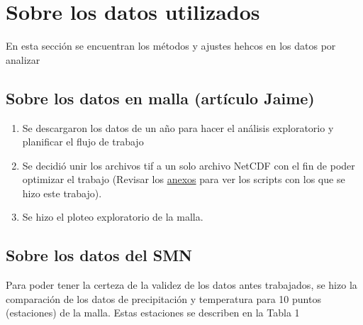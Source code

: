 \documentclass[
  11pt,
  letterpaper,
  DIV=11,
  numbers=noendperiod]{scrartcl}
\providecommand{\tightlist}{%
  \setlength{\itemsep}{0pt}\setlength{\parskip}{0pt}}
\begin{document}
\section{Sobre los datos utilizados}\label{sobre-los-datos-utilizados}

\begin{tcolorbox}[enhanced jigsaw, breakable, left=2mm, arc=.35mm, colbacktitle=quarto-callout-important-color!10!white, colframe=quarto-callout-important-color-frame, leftrule=.75mm, opacityback=0, toptitle=1mm, opacitybacktitle=0.6, bottomtitle=1mm, toprule=.15mm, titlerule=0mm, rightrule=.15mm, title=\textcolor{quarto-callout-important-color}{\faExclamation}\hspace{0.5em}{Descripción de la sección}, colback=white, bottomrule=.15mm, coltitle=black]

En esta sección se encuentran los métodos y ajustes hehcos en los datos
por analizar

\end{tcolorbox}

\subsection{Sobre los datos en malla (artículo
Jaime)}\label{sobre-los-datos-en-malla-artuxedculo-jaime}

\begin{enumerate}
\def\labelenumi{\arabic{enumi}.}
\tightlist
\item
  Se descargaron los datos de un año para hacer el análisis exploratorio
  y planificar el flujo de trabajo
\item
  Se decidió unir los archivos tif a un solo archivo NetCDF con el fin
  de poder optimizar el trabajo (Revisar los
  \hyperref[scripts-de-trabajo-con-mallas-nc-y-tif]{anexos} para ver los
  scripts con los que se hizo este trabajo).
\item
  Se hizo el ploteo exploratorio de la malla.
\end{enumerate}

\subsection{Sobre los datos del SMN}\label{sobre-los-datos-del-smn}

Para poder tener la certeza de la validez de los datos antes trabajados,
se hizo la comparación de los datos de precipitación y temperatura para
10 puntos (estaciones) de la malla. Estas estaciones se describen en la
Tabla 1
\end{document}

